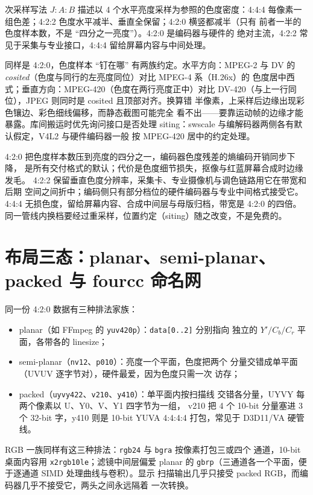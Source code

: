 \documentclass[12pt,a4paper,fontset=fandol]{ctexbook}
\newcommand{\Tp}[1]{\texttt{#1}}
\begin{document}
次采样写法 \(J:A:B\) 描述以 4 个水平亮度采样为参照的色度密度：4:4:4
每像素一组色差；4:2:2 色度水平减半、垂直全保留；4:2:0 横竖都减半（只有
前者一半的色度样本数，不是 ``四分之一亮度''）。4:2:0 是编码器与硬件的
绝对主流，4:2:2 常见于采集与专业接口，4:4:4 留给屏幕内容与中间处理。

同样是 4:2:0，色度样本 ``钉在哪'' 有两族约定。水平方向：MPEG-2 与 DV 的
\emph{cosited}（色度与同行的左亮度同位）对比 MPEG-4 系（H.26x）的
色度居中西式；垂直方向：MPEG-420（色度在两行亮度正中）对比
DV-420（与上一行同位），JPEG 则同时是 cosited 且顶部对齐。换算错
半像素，上采样后边缘出现彩色镶边、彩色细线偏移，而静态截图可能完全
看不出——要靠运动帧的边缘才能暴露。库间搬运时优先询问接口是否处理
siting：swscale 与编解码器两侧各有默认假定，V4L2 与硬件编码器一般
按 MPEG-420 居中的约定处理。

\begin{compare}[title={三档次采样的取舍}]
4:2:0 把色度样本数压到亮度的四分之一，编码器色度残差的熵编码开销同步下降，
是所有交付格式的默认；代价是色度细节损失，抠像与红蓝屏幕合成时边缘发毛。
4:2:2 保留垂直色度分辨率，采集卡、专业摄像机与调色链路用它在带宽和后期
空间之间折中；编码侧只有部分档位的硬件编码器与专业中间格式接受它。
4:4:4 无损色度，留给屏幕内容、合成中间层与母版归档，带宽是 4:2:0 的四倍。
同一管线内换档要经过重采样，位置约定（siting）随之改变，不是免费的。
\end{compare}

\section{布局三态：planar、semi-planar、packed 与 fourcc 命名网}

同一份 4:2:0 数据有三种排法家族：
\begin{itemize}
\item planar（如 FFmpeg 的 \Tp{yuv420p}）：\Tp{data[0..2]} 分别指向
      独立的 \(Y' / C_b / C_r\) 平面，各带各的 linesize；
\item semi-planar（\Tp{nv12}、\Tp{p010}）：亮度一个平面，色度把两个
      分量交错成单平面（UVUV 逐字节对），硬件最爱，因为色度只需一次
      访存；
\item packed（\Tp{uyvy422}、\Tp{v210}、\Tp{y410}）：单平面内按扫描线
      交错各分量，UYVY 每两个像素以 U、Y0、V、Y1 四字节为一组，
      v210 把 4 个 10-bit 分量塞进 3 个 32-bit 字，y410 则是 10-bit
      YUVA 4:4:4:4 打包，常见于 D3D11/VA 硬管线。
\end{itemize}

RGB 一族同样有这三种排法：\Tp{rgb24} 与 \Tp{bgra} 按像素打包三或四个
通道，10-bit 桌面内容用 \Tp{x2rgb10le}；滤镜中间层偏爱 planar 的
\Tp{gbrp}（三通道各一个平面，便于逐通道 SIMD 处理曲线与卷积）。显示
扫描输出几乎只接受 packed RGB，而编码器几乎不接受它，两头之间永远隔着
一次转换。
\end{document}
